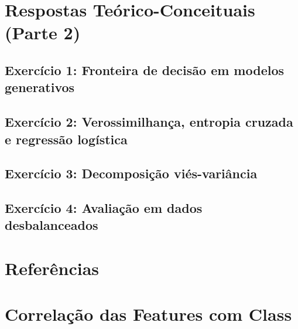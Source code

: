 \documentclass[a4paper,12pt]{article}
\begin{document}
\section{Respostas Teórico-Conceituais (Parte 2)}
\label{sec:teoria}

\subsection{Exercício 1: Fronteira de decisão em modelos generativos}
\label{subsec:ex1}

\subsection{Exercício 2: Verossimilhança, entropia cruzada e regressão logística}
\label{subsec:ex2}

\subsection{Exercício 3: Decomposição viés-variância}
\label{subsec:ex3}

\subsection{Exercício 4: Avaliação em dados desbalanceados}
\label{subsec:ex4}

\section{Referências}
\label{sec:referencias}
% 
% 
\appendix
\section{Correlação das Features com Class}
\label{apendice:correlacao}
\end{document}
